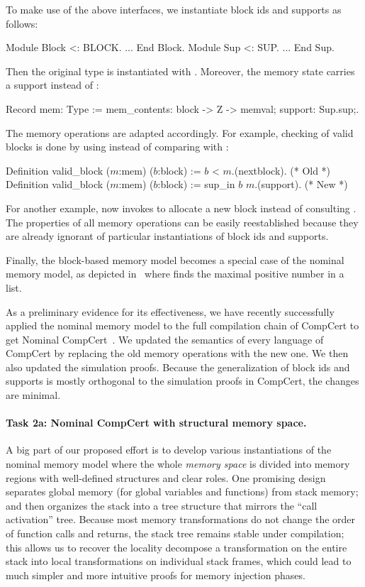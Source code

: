 To make use of the above interfaces, we instantiate block ids and
supports as follows:
%
\begin{coq}
  Module Block <: BLOCK. ... End Block.           Module Sup <: SUP. ... End Sup.
\end{coq}
%
Then the original  type is instantiated with
. Moreover, the memory state carries a support instead of
\nextblock:
%
\begin{coq}
  Record mem: Type := { mem_contents: block -> Z -> memval;   support: Sup.sup;}.
\end{coq}
%
The memory operations are adapted accordingly. For example, checking
of valid blocks is done by using  instead of comparing
with \nextblock:
%
\begin{coq}
  Definition valid_block ($m$:mem) ($b$:block) := $b$ < $m$.(nextblock).   (* Old *)
  Definition valid_block ($m$:mem) ($b$:block) := sup_in $b$ $m$.(support).  (* New *)
\end{coq}
%
For another example,  now invokes  to
allocate a new block instead of consulting \nextblock.
The properties of all memory operations can be easily reestablished
because they are already ignorant of particular instantiations of block ids
and supports. 

Finally, the block-based memory model becomes a special case of the
nominal memory model, as depicted in~ where
 finds the maximal positive number in a list.

As a preliminary evidence for its effectiveness, we have recently
successfully applied the nominal memory model to the full compilation
chain of CompCert to get Nominal CompCert~\cite{wang2022}.  We updated
the semantics of every language of CompCert by replacing the old
memory operations with the new one. We then also updated the
simulation proofs. Because the generalization of block ids and
supports is mostly orthogonal to the simulation proofs in CompCert,
the changes are minimal.

\vspace*{-2ex}
\paragraph*{Task 2a: Nominal CompCert with structural memory space.}
A big part of our proposed effort is to develop various instantiations
of the nominal memory model where the whole {\em memory space} is
divided into memory regions with well-defined structures and clear
roles. One promising design~\cite{wang2022} separates global memory
(for global variables and functions) from stack memory; and then
organizes the stack into a tree structure that mirrors the ``call
activation'' tree.  Because most memory transformations do not change
the order of function calls and returns, the stack tree remains stable
under compilation; this allows us to recover the locality decompose a
transformation on the entire stack into local transformations on
individual stack frames, which could lead to much simpler and more
intuitive proofs for memory injection phases.

